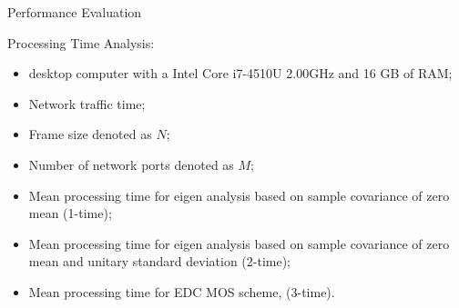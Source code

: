 \documentclass[newPxFont, numfooter, sectionpages]{beamer}
\begin{document}
\begin{frame}{Performance Evaluation}
	
	Processing Time Analysis:
	\begin{itemize}
		\item desktop computer with a Intel Core i7-4510U 2.00GHz and 16 GB of RAM;
		\item Network traffic time; 
		\item Frame size denoted as $N$; 
		\item Number of network ports denoted as $M$; 
		\item Mean processing time for eigen analysis based on sample covariance of zero mean (1-time); 
		\item Mean processing time for eigen analysis based on sample covariance of zero mean and unitary standard deviation (2-time); 
		\item Mean processing time for EDC MOS scheme, (3-time).
	\end{itemize}
	
\end{frame}
\end{document}
